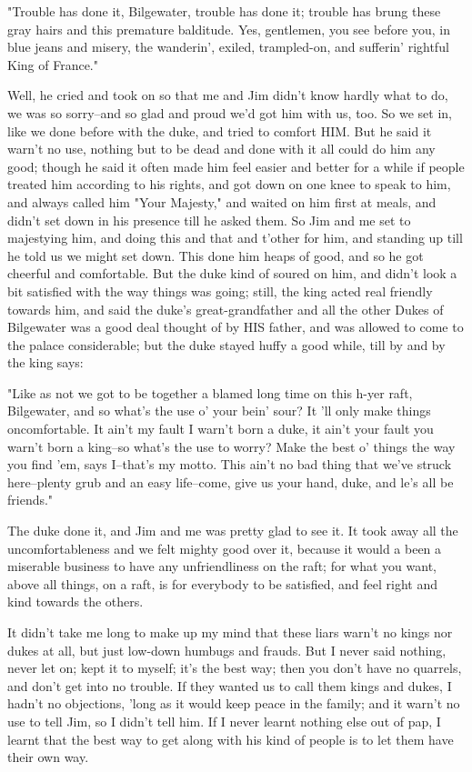 "Trouble has done it, Bilgewater, trouble has done it; trouble has brung
these gray hairs and this premature balditude.  Yes, gentlemen, you see
before you, in blue jeans and misery, the wanderin', exiled, trampled-on,
and sufferin' rightful King of France."

Well, he cried and took on so that me and Jim didn't know hardly what to
do, we was so sorry--and so glad and proud we'd got him with us, too.  So
we set in, like we done before with the duke, and tried to comfort HIM.
But he said it warn't no use, nothing but to be dead and done with it all
could do him any good; though he said it often made him feel easier and
better for a while if people treated him according to his rights, and got
down on one knee to speak to him, and always called him "Your Majesty,"
and waited on him first at meals, and didn't set down in his presence
till he asked them. So Jim and me set to majestying him, and doing this
and that and t'other for him, and standing up till he told us we might
set down.  This done him heaps of good, and so he got cheerful and
comfortable.  But the duke kind of soured on him, and didn't look a bit
satisfied with the way things was going; still, the king acted real
friendly towards him, and said the duke's great-grandfather and all the
other Dukes of Bilgewater was a good deal thought of by HIS father, and
was allowed to come to the palace considerable; but the duke stayed huffy
a good while, till by and by the king says:

"Like as not we got to be together a blamed long time on this h-yer raft,
Bilgewater, and so what's the use o' your bein' sour?  It 'll only make
things oncomfortable.  It ain't my fault I warn't born a duke, it ain't
your fault you warn't born a king--so what's the use to worry?  Make the
best o' things the way you find 'em, says I--that's my motto.  This ain't
no bad thing that we've struck here--plenty grub and an easy life--come,
give us your hand, duke, and le's all be friends."

The duke done it, and Jim and me was pretty glad to see it.  It took away
all the uncomfortableness and we felt mighty good over it, because it
would a been a miserable business to have any unfriendliness on the raft;
for what you want, above all things, on a raft, is for everybody to be
satisfied, and feel right and kind towards the others.

It didn't take me long to make up my mind that these liars warn't no
kings nor dukes at all, but just low-down humbugs and frauds.  But I
never said nothing, never let on; kept it to myself; it's the best way;
then you don't have no quarrels, and don't get into no trouble.  If they
wanted us to call them kings and dukes, I hadn't no objections, 'long as
it would keep peace in the family; and it warn't no use to tell Jim, so I
didn't tell him.  If I never learnt nothing else out of pap, I learnt
that the best way to get along with his kind of people is to let them
have their own way.




